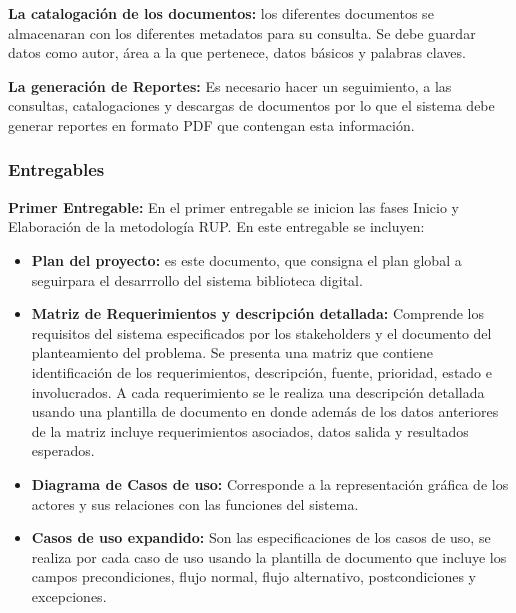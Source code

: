 \documentclass[]{article}
\begin{document}
        \textbf{La catalogación de los documentos:} los diferentes documentos se almacenaran con 
        los diferentes metadatos para su consulta. Se debe guardar datos como autor, área a la que 
        pertenece, datos básicos y palabras claves.
        
        \textbf{La generación de Reportes:} Es necesario hacer un seguimiento, a las consultas,
        catalogaciones y descargas de documentos por lo que el sistema debe generar reportes en 
        formato PDF que contengan esta información.
        
                \subsubsection{Entregables}
                \textbf{Primer Entregable:} En el primer entregable se inicion las fases Inicio y
                Elaboración de la metodología RUP. En este entregable se incluyen:
                
                \begin{itemize}
                \item\textbf{Plan del proyecto:} es este documento, que consigna el plan global a
                seguirpara el desarrrollo del sistema biblioteca digital.
                \item\textbf{Matriz de Requerimientos y descripción detallada:} Comprende los
                requisitos del sistema especificados por los stakeholders y el documento del
                planteamiento del problema.
                Se presenta una matriz que contiene identificación de los requerimientos,
                descripción, fuente, prioridad, estado e involucrados. A cada requerimiento se le
                realiza una descripción detallada usando una plantilla de documento en donde además
                de los datos anteriores de la matriz incluye requerimientos asociados, datos salida
                y resultados esperados.
                \item\textbf{Diagrama de Casos de uso:} Corresponde a la representación gráfica de
                los actores y sus relaciones con las funciones del sistema.
                \item\textbf{Casos de uso expandido:} Son las especificaciones de los casos de uso,
                se realiza por cada caso de uso usando la plantilla de documento que incluye los
                campos precondiciones, flujo normal, flujo alternativo, postcondiciones y 
                excepciones.
                \end{itemize}
                
\end{document}
